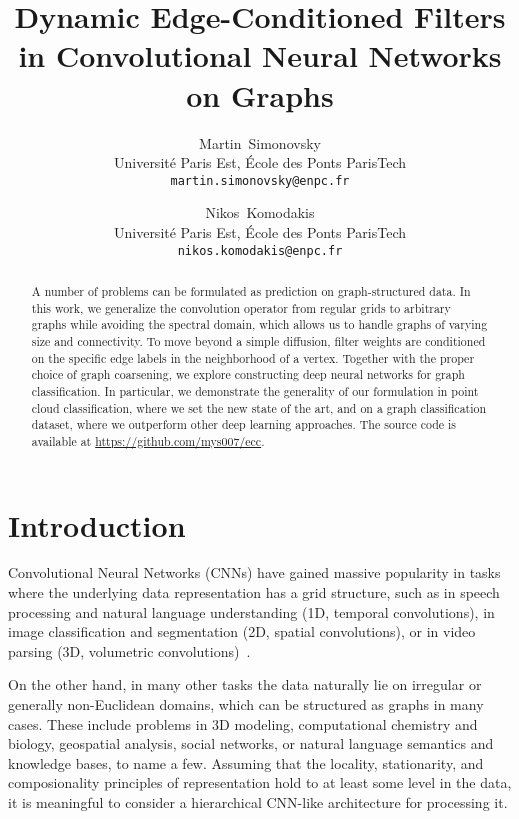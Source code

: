 \documentclass[10pt,twocolumn,letterpaper]{article}
\begin{document}
\title{Dynamic Edge-Conditioned Filters in Convolutional Neural Networks on Graphs}
\author{Martin~Simonovsky\\
Universit\'{e} Paris Est, \'{E}cole des Ponts ParisTech\\
{\tt\small martin.simonovsky@enpc.fr}
\and
Nikos~Komodakis\\
Universit\'{e} Paris Est, \'{E}cole des Ponts ParisTech\\
{\tt\small nikos.komodakis@enpc.fr}
}



\maketitle


\begin{abstract}
A number of problems can be formulated as prediction on graph-structured data. In this work, we generalize the convolution operator from regular grids to arbitrary graphs while avoiding the spectral domain, which allows us to handle graphs of varying size and connectivity. To move beyond a simple diffusion, filter weights are conditioned on the specific edge labels in the neighborhood of a vertex. Together with the proper choice of graph coarsening, we explore constructing deep neural networks for graph classification. In particular, we demonstrate the generality of our formulation in point cloud classification, where we set the new state of the art, and on a graph classification dataset, where we outperform other deep learning approaches. The source code is available at \url{https://github.com/mys007/ecc}.
\end{abstract}

\def\eg{\textit{e.g.}~}
\def\Eg{\textit{E.g.}~}
\def\etal{\textit{et al.}\xspace}
\def\ie{\textit{i.e.}~}
\def\cf{\textit{c.f.}~}
\def\wrt{{w.r.t.}~}


\section{Introduction}

Convolutional Neural Networks (CNNs) have gained massive popularity in tasks where the underlying data representation has a grid structure, such as in speech processing and natural language understanding (1D, temporal convolutions), in image classification and segmentation (2D, spatial convolutions), or in video parsing (3D, volumetric convolutions)~\cite{lecun2015deep}. 

On the other hand, in many other tasks the data naturally lie on irregular or generally non-Euclidean domains, which can be structured as graphs in many cases. These include problems in 3D modeling, computational chemistry and biology, geospatial analysis, social networks, or natural language semantics and knowledge bases, to name a few. Assuming that the locality, stationarity, and composionality principles of representation hold to at least some level in the data, it is meaningful to consider a hierarchical CNN-like architecture for processing it.
\end{document}
